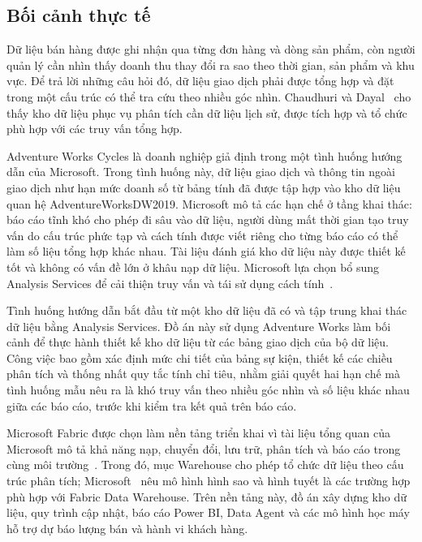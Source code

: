 
\subsection{Bối cảnh thực tế}

Dữ liệu bán hàng được ghi nhận qua từng đơn hàng và dòng sản phẩm, còn người quản lý cần nhìn thấy doanh thu thay đổi ra sao theo thời gian, sản phẩm và khu vực. Để trả lời những câu hỏi đó, dữ liệu giao dịch phải được tổng hợp và đặt trong một cấu trúc có thể tra cứu theo nhiều góc nhìn.  Chaudhuri và Dayal~\citeyearpar{chaudhuri1997} cho thấy kho dữ liệu phục vụ phân tích cần dữ liệu lịch sử, được tích hợp và tổ chức phù hợp với các truy vấn tổng hợp.

Adventure Works Cycles là doanh nghiệp giả định trong một tình huống hướng dẫn của Microsoft. Trong tình huống này, dữ liệu giao dịch và thông tin ngoài giao dịch như hạn mức doanh số từ bảng tính đã được tập hợp vào kho dữ liệu quan hệ AdventureWorksDW2019. Microsoft mô tả các hạn chế ở tầng khai thác: báo cáo tĩnh khó cho phép đi sâu vào dữ liệu, người dùng mất thời gian tạo truy vấn do cấu trúc phức tạp và cách tính được viết riêng cho từng báo cáo có thể làm số liệu tổng hợp khác nhau. Tài liệu đánh giá kho dữ liệu này được thiết kế tốt và không có vấn đề lớn ở khâu nạp dữ liệu. Microsoft lựa chọn bổ sung Analysis Services để cải thiện truy vấn và tái sử dụng cách tính~\citep{microsoft-scenario}.

Tình huống hướng dẫn bắt đầu từ một kho dữ liệu đã có và tập trung khai thác dữ liệu bằng Analysis Services. Đồ án này sử dụng Adventure Works làm bối cảnh để thực hành thiết kế kho dữ liệu từ các bảng giao dịch của bộ dữ liệu. Công việc bao gồm xác định mức chi tiết của bảng sự kiện, thiết kế các chiều phân tích và thống nhất quy tắc tính chỉ tiêu, nhằm giải quyết hai hạn chế mà tình huống mẫu nêu ra là khó truy vấn theo nhiều góc nhìn và số liệu khác nhau giữa các báo cáo, trước khi kiểm tra kết quả trên báo cáo.

Microsoft Fabric được chọn làm nền tảng triển khai vì tài liệu tổng quan của Microsoft mô tả khả năng nạp, chuyển đổi, lưu trữ, phân tích và báo cáo trong cùng môi trường~\citep{microsoft-fabric}. Trong đó, mục Warehouse cho phép tổ chức dữ liệu theo cấu trúc phân tích; Microsoft~\citeyearpar{microsoft-warehouse} nêu mô hình hình sao và hình tuyết là các trường hợp phù hợp với Fabric Data Warehouse. Trên nền tảng này, đồ án xây dựng kho dữ liệu, quy trình cập nhật, báo cáo Power BI, Data Agent và các mô hình học máy hỗ trợ dự báo lượng bán và hành vi khách hàng.

